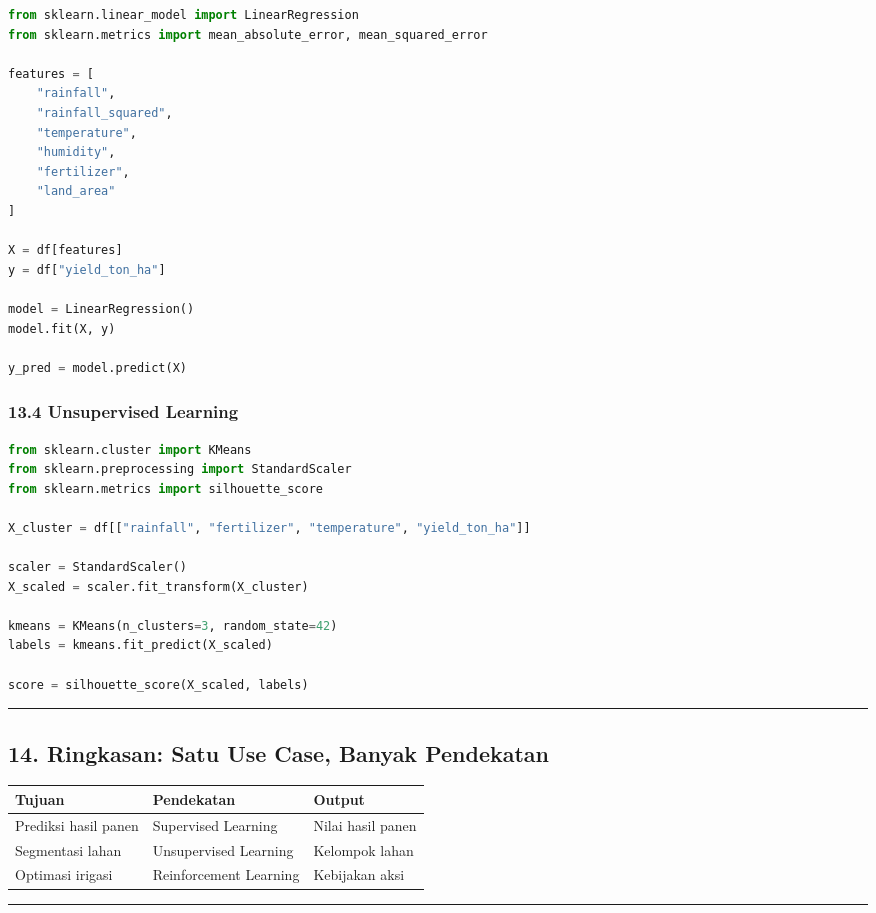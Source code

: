 \documentclass[12pt,a4paper]{article}
\begin{document}
\begin{lstlisting}[language=Python]
from sklearn.linear_model import LinearRegression
from sklearn.metrics import mean_absolute_error, mean_squared_error

features = [
    "rainfall",
    "rainfall_squared",
    "temperature",
    "humidity",
    "fertilizer",
    "land_area"
]

X = df[features]
y = df["yield_ton_ha"]

model = LinearRegression()
model.fit(X, y)

y_pred = model.predict(X)
\end{lstlisting}

\subsubsection{13.4 Unsupervised Learning}

\begin{lstlisting}[language=Python]
from sklearn.cluster import KMeans
from sklearn.preprocessing import StandardScaler
from sklearn.metrics import silhouette_score

X_cluster = df[["rainfall", "fertilizer", "temperature", "yield_ton_ha"]]

scaler = StandardScaler()
X_scaled = scaler.fit_transform(X_cluster)

kmeans = KMeans(n_clusters=3, random_state=42)
labels = kmeans.fit_predict(X_scaled)

score = silhouette_score(X_scaled, labels)
\end{lstlisting}

\hrule


\subsection{14. Ringkasan: Satu Use Case, Banyak Pendekatan}

\begin{tabular}{|l|l|l|}
\hline
Tujuan & Pendekatan & Output \\
\hline
Prediksi hasil panen & Supervised Learning & Nilai hasil panen \\
\hline
Segmentasi lahan & Unsupervised Learning & Kelompok lahan \\
\hline
Optimasi irigasi & Reinforcement Learning & Kebijakan aksi \\
\hline
\end{tabular}


\hrule
\end{document}
